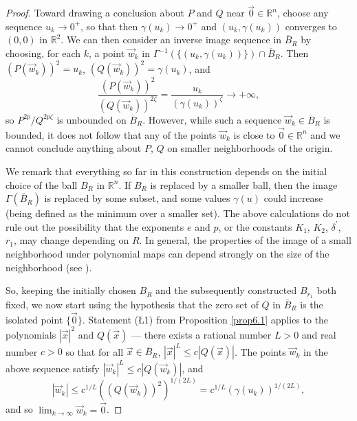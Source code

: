 \documentclass[12pt]{amsart}
\theoremstyle{definition}
\theoremstyle{remark}
\numberwithin{equation}{section}
\newcommand{\re}{\mathbb{R}}
\begin{document}
\begin{proof}
    Toward drawing a conclusion about $P$ and $Q$ near $\vec0\in\re^n$, choose any sequence $u_k\to0^+$, so that then $\gamma(u_k)\to0^+$ and $(u_k,\gamma(u_k))$ converges to $(0,0)$ in $\re^2$.  We can then consider an inverse image sequence in ${\overline B}_R$ by choosing, for each $k$, a point $\vec w_k$ in $\Gamma^{-1}(\{(u_k,\gamma(u_k))\})\cap{\overline B}_R$.  Then $(P(\vec w_k))^2=u_k$, $(Q(\vec w_k))^2=\gamma(u_k)$, and \begin{equation}\label{eq2.1}
      \frac{(P(\vec w_k))^2}{(Q(\vec w_k))^{2\zeta}}=\frac{u_k}{(\gamma(u_k))^{\zeta}}\to+\infty,
    \end{equation}
    so $P^{2p}/Q^{2p\zeta}$ is unbounded on ${\overline B}_R$.  However, while such a sequence $\vec w_k\in{\overline B}_R$ is bounded, it does not follow that any of the points $\vec w_k$ is close to $\vec0\in\re^n$ and we cannot conclude anything about $P$, $Q$ on smaller neighborhoods of the origin.

    
    We remark that everything so far in this construction depends on the initial choice of the ball $B_R$ in $\re^n$.  If $B_R$ is replaced by a smaller ball, then the image $\Gamma(\overline{B}_R)$ is replaced by some subset, and some values $\gamma(u)$ could increase (being defined as the minimum over a smaller set).  The above calculations do not rule out the possibility that the exponents $e$ and $p$, or the constants $K_1$, $K_2$, $\delta^\prime$, $r_1$, may change depending on $R$.  In general, the properties of the image of a small neighborhood under polynomial maps can depend strongly on the size of the neighborhood (see \cite{jt}).

    So, keeping the initially chosen $B_R$ and the subsequently constructed $B_{r_1}$ both fixed, we now start using the hypothesis that the zero set of $Q$ in ${\overline B}_R$ is the isolated point $\{\vec0\}$.  Statement (\L1) from Proposition \ref{prop6.1} applies to the polynomials $|\vec x|^2$ and $Q(\vec x)$  ---  there exists a rational number $L>0$ and real number $c>0$ so that for all $\vec x\in\overline{B}_R$, $|\vec x|^L\le c|Q(\vec x)|$.  The points $\vec w_k$ in the above sequence satisfy $|\vec w_k|^L\le c|Q(\vec w_k)|$, and $$|\vec w_k|\le c^{1/L}((Q(\vec w_k))^2)^{1/(2L)}=c^{1/L}(\gamma(u_k))^{1/(2L)},$$ and so $\displaystyle{\lim_{k\to\infty}\vec w_k=\vec0}$.

    
    

\end{proof}
\end{document}
